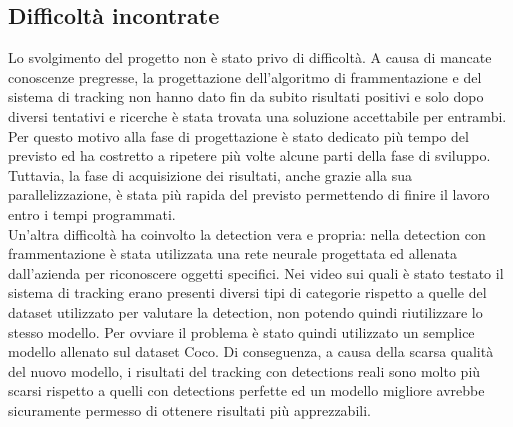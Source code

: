 \subsection{Difficoltà incontrate}
Lo svolgimento del progetto non è stato privo di difficoltà. A causa di mancate conoscenze pregresse, la progettazione dell'algoritmo di frammentazione e del sistema di tracking non hanno dato fin da subito risultati positivi e solo dopo diversi tentativi e ricerche è stata trovata una soluzione accettabile per entrambi. Per questo motivo alla fase di progettazione è stato dedicato più tempo del previsto ed ha costretto a ripetere più volte alcune parti della fase di sviluppo. Tuttavia, la fase di acquisizione dei risultati, anche grazie alla sua parallelizzazione, è stata più rapida del previsto permettendo di finire il lavoro entro i tempi programmati.\\
Un'altra difficoltà ha coinvolto la detection vera e propria: nella detection con frammentazione è stata utilizzata una rete neurale progettata ed allenata dall'azienda per riconoscere oggetti specifici. Nei video sui quali è stato testato il sistema di tracking erano presenti diversi tipi di categorie rispetto a quelle del dataset utilizzato per valutare la detection, non potendo quindi riutilizzare lo stesso modello. Per ovviare il problema è stato quindi utilizzato un semplice modello allenato sul dataset Coco. Di conseguenza, a causa della scarsa qualità del nuovo modello, i risultati del tracking con detections reali sono molto più scarsi rispetto a quelli con detections perfette ed un modello migliore avrebbe sicuramente permesso di ottenere risultati più apprezzabili. 